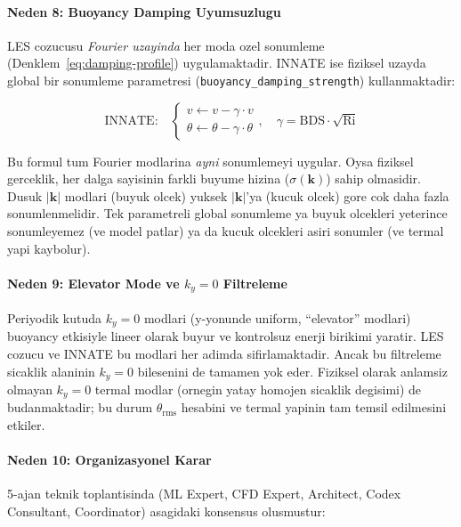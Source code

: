 \paragraph{Neden 8: Buoyancy Damping Uyumsuzlugu}

LES cozucusu \emph{Fourier uzayinda} her moda ozel sonumleme
(Denklem~\ref{eq:damping-profile}) uygulamaktadir. INNATE ise fiziksel
uzayda global bir sonumleme parametresi (\texttt{buoyancy\_damping\_strength})
kullanmaktadir:

\begin{equation}
  \text{INNATE:} \quad
  \begin{cases}
    v \leftarrow v - \gamma \cdot v \\
    \theta \leftarrow \theta - \gamma \cdot \theta
  \end{cases}
  , \quad \gamma = \text{BDS} \cdot \sqrt{\text{Ri}}
  \label{eq:innate-damping}
\end{equation}

Bu formul tum Fourier modlarina \emph{ayni} sonumlemeyi uygular. Oysa
fiziksel gerceklik, her dalga sayisinin farkli buyume hizina ($\sigma(\mathbf{k})$)
sahip olmasidir. Dusuk $|\mathbf{k}|$ modlari (buyuk olcek) yuksek
$|\mathbf{k}|$'ya (kucuk olcek) gore cok daha fazla sonumlenmelidir. Tek
parametreli global sonumleme ya buyuk olcekleri yeterince sonumleyemez (ve
model patlar) ya da kucuk olcekleri asiri sonumler (ve termal yapi kaybolur).


\paragraph{Neden 9: Elevator Mode ve $k_y = 0$ Filtreleme}

Periyodik kutuda $k_y = 0$ modlari (y-yonunde uniform, ``elevator'' modlari)
buoyancy etkisiyle lineer olarak buyur ve kontrolsuz enerji birikimi yaratir.
LES cozucu ve INNATE bu modlari her adimda sifirlamaktadir. Ancak bu
filtreleme sicaklik alaninin $k_y = 0$ bilesenini de tamamen yok eder.
Fiziksel olarak anlamsiz olmayan $k_y = 0$ termal modlar (ornegin yatay
homojen sicaklik degisimi) de budanmaktadir; bu durum $\theta_\text{rms}$
hesabini ve termal yapinin tam temsil edilmesini etkiler.


\paragraph{Neden 10: Organizasyonel Karar}

5-ajan teknik toplantisinda (ML Expert, CFD Expert, Architect, Codex Consultant,
Coordinator) asagidaki konsensus olusmustur:

